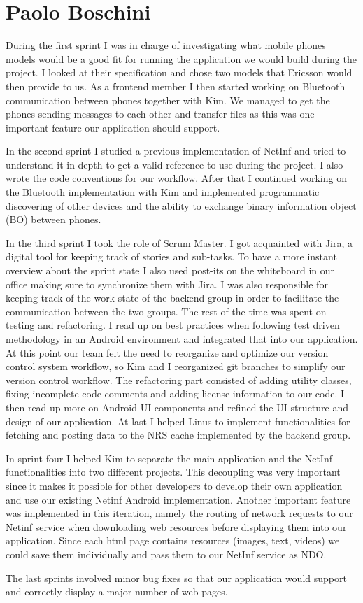 \section{Paolo Boschini}
During the first sprint I was in charge of investigating what mobile phones models
would be a good fit for running the application we would build during the project.
I looked at their specification and chose two models that Ericsson would then provide to us.
As a frontend member I then started working on Bluetooth communication between phones
together with Kim. We managed to get the phones sending messages to each other and transfer
files as this was one important feature our application should support.

In the second sprint I studied a previous implementation of NetInf and tried to understand
it in depth to get a valid reference to use during the project. 
I also wrote the code conventions for our workflow. After that I continued working on the Bluetooth implementation
with Kim and implemented programmatic discovering of other devices and the ability to
exchange binary information object (BO) between phones.

In the third sprint I took the role of Scrum Master. I got acquainted with Jira, a digital tool for keeping track of stories and sub-tasks.
To have a more instant overview about the sprint state I also used post-its on the whiteboard in our office making sure to synchronize them with Jira.
I was also responsible for keeping track of the work state of the backend group in order to facilitate the communication between
the two groups. The rest of the time was spent on testing and refactoring. I read up on best practices when following 
test driven methodology in an Android environment and integrated that into our application.
At this point our team felt the need to reorganize and optimize our version control system workflow,
so Kim and I reorganized git branches to simplify our version control workflow.
The refactoring part consisted of adding utility classes, fixing incomplete code comments and adding license
information to our code. I then read up more on Android UI components and refined the UI structure and design of our application.
At last I helped Linus to implement functionalities for fetching and posting data to the NRS cache implemented by the backend group.

In sprint four I helped Kim to separate the main application and the NetInf functionalities into two different projects.
This decoupling was very important since it makes it possible for other developers to develop their own application
and use our existing Netinf Android implementation.
Another important feature was implemented in this iteration, namely the routing of network requests to our Netinf service
when downloading web resources before displaying them into our application. Since each html page contains resources (images, text, videos) we could
save them individually and pass them to our NetInf service as NDO.

The last sprints involved minor bug fixes so that our application would support and correctly display a major number of web pages.
